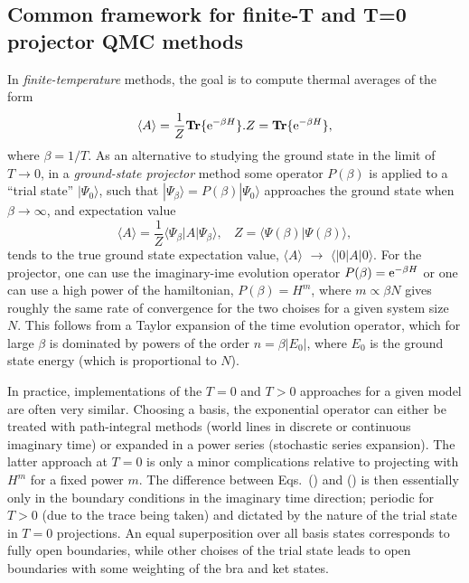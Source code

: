 \documentclass[aps,prb,groupedaddress,twocolumn]{revtex4}
\begin{document}
\subsection{Common framework for finite-T and T=0 projector QMC methods}
\label{ss:method}

In {\it finite-temperature} methods, the goal is to compute thermal averages of the form
\begin{equation}
\langle A\rangle = \frac{1}{Z}{\bf Tr}\{ {\rm e}^{-\beta H}\}.
Z = {\bf Tr}\{ {\rm e}^{-\beta H}\},
\end{equation}
where $\beta=1/T$. As an alternative to studying the ground state in the limit of  $T\to 0$, in a {\it ground-state projector} method some 
operator $P(\beta)$  is applied to a ``trial state'' $|\Psi_0\rangle$, such that $|\Psi_\beta \rangle = P(\beta)|\Psi_0\rangle$ approaches the 
ground state when $\beta \to \infty$, and expectation value 
\begin{equation}
\langle A\rangle = \frac{1}{Z}\langle \Psi_\beta|A|\Psi_\beta\rangle,~~~~ Z = \langle \Psi(\beta)|\Psi(\beta)\rangle,
\end{equation}
tends to the true ground state expectation value, $\langle A\rangle$ $\to$ $\langle|0| A|0\rangle$. For the projector, one can use the imaginary-ime
evolution operator $P(\beta)={\rm e}^{-\beta H}$ or one can use a high power of the hamiltonian, $P(\beta)=H^m$, where $m \propto \beta N$ gives roughly the same rate of convergence for the two choises for a given system size $N$. This follows from a Taylor expansion of the time evolution operator, 
which for large $\beta$ is dominated by powers of the order $n=\beta |E_0|$, where $E_0$ is the ground state energy (which is proportional to $N$).

In practice, implementations of the $T=0$ and $T>0$ approaches for a given model are often very similar. Choosing a basis, the exponential
operator can either be treated with path-integral methods (world lines in discrete or continuous imaginary time) or expanded in a power series 
(stochastic series expansion). The latter approach at $T=0$ is only a minor complications relative to projecting with $H^m$ for a fixed
power $m$. The difference between Eqs.~() and () is then essentially only in the boundary conditions in the imaginary time direction; 
periodic for $T>0$ (due to the trace being taken) and dictated by the nature of the trial state in $T=0$ projections. An equal superposition 
over all basis states corresponds to fully open boundaries, while other choises of the trial state leads to open boundaries with some 
weighting of the bra and ket states. 
\end{document}
